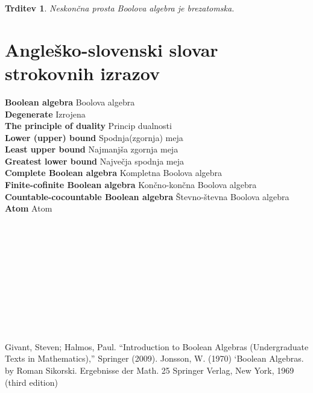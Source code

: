 \documentclass{amsart}
\newcommand{\geslo}[2]{\noindent\textbf{#1} \quad \hangindent=1cm #2\\[-1pc]}
\newtheorem{trditev}[izrek]{Trditev}
\begin{document}
\begin{trditev}
    Neskončna prosta Boolova algebra je brezatomska.
\end{trditev}

































\newpage
\section*{Angleško-slovenski slovar strokovnih izrazov}


\geslo{Boolean algebra}{Boolova algebra}

\geslo{Degenerate}{Izrojena}

\geslo{The principle of duality}{Princip dualnosti}

\geslo{Lower (upper) bound}{Spodnja(zgornja) meja}

\geslo{Least upper bound}{Najmanjša zgornja meja}

\geslo{Greatest lower bound}{Največja spodnja meja}

\geslo{Complete Boolean algebra}{Kompletna Boolova algebra}

\geslo{Finite-cofinite Boolean algebra}{Končno-končna Boolova algebra}

\geslo{Countable-cocountable Boolean algebra}{Števno-števna Boolova algebra}

\geslo{Atom}{Atom}

\geslo{}{}

\geslo{}{}

\geslo{}{}

\geslo{}{}

\geslo{}{}

\geslo{}{}

\geslo{}{}

\geslo{}{}

\geslo{}{}


\geslo{}{}






\begin{thebibliography}{1}
Givant, Steven; Halmos, Paul. ``Introduction to Boolean Algebras (Undergraduate Texts in Mathematics),'' Springer (2009).
Jonsson, W. (1970) ‘Boolean Algebras. by Roman Sikorski. Ergebnisse der Math. 25 Springer Verlag, New York, 1969 (third edition)
\end{thebibliography}
\end{document}
